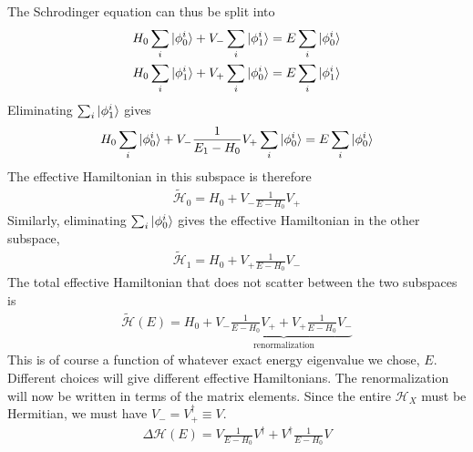 \documentclass[twoside]{report}
\numberwithin{equation}{section}
\begin{document}
The Schrodinger equation can thus be split into
\begin{equation}\begin{aligned}
H_0 \sum_i \ket{\phi^i_0} + V_-\sum_i \ket{\phi^i_1} &= E \sum_i \ket{\phi^i_0}\\
H_0 \sum_i \ket{\phi^i_1} + V_+\sum_i \ket{\phi^i_0} &= E \sum_i \ket{\phi^i_1}\\
\end{aligned}\end{equation}
Eliminating \(\sum_i \ket{\phi^i_1}\) gives
\begin{equation}\begin{aligned}
H_0 \sum_i \ket{\phi^i_0} + V_-\frac{1}{E_1 - H_0}V_+\sum_i \ket{\phi^i_0} &= E \sum_i \ket{\phi^i_0}\\
\end{aligned}\end{equation}
The effective Hamiltonian in this subspace is therefore
\begin{equation}\begin{aligned}
	\tilde{\mathcal{H}}_0 = H_0 + V_-\frac{1}{E - H_0}V_+
\end{aligned}\end{equation}
Similarly, eliminating \(\sum_i \ket{\phi^i_0}\) gives the effective Hamiltonian in the other subspace,
\begin{equation}\begin{aligned}
	\tilde{\mathcal{H}}_1 = H_0 + V_+\frac{1}{E - H_0}V_-
\end{aligned}\end{equation}
The total effective Hamiltonian that does not scatter between the two subspaces is
\begin{equation}\begin{aligned}
	\tilde{\mathcal{H}}(E) = H_0 + \underbrace{V_-\frac{1}{E - H_0}V_+ +  V_+\frac{1}{E - H_0}V_-}_\text{renormalization}
\end{aligned}\end{equation}
This is of course a function of whatever exact energy eigenvalue we chose, \(E\). Different choices will give different effective Hamiltonians. The renormalization will now be written in terms of the matrix elements. Since the entire \(\mathcal{H}_X\) must be Hermitian, we must have \(V_- = V_+^\dagger \equiv V\).
\begin{equation}\begin{aligned}
\Delta \mathcal{H}(E) = V\frac{1}{E - H_0}V^\dagger +  V^\dagger\frac{1}{E - H_0}V
\end{aligned}\end{equation}
\end{document}
